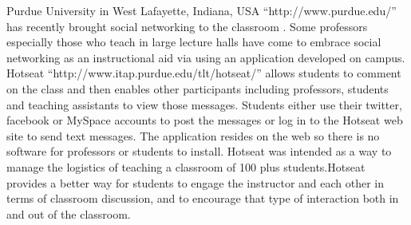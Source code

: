 \documentclass[12pt,a4paper,final,twoside,onecolumn,titlepage]{book}
\begin{document}
Purdue University in West Lafayette, Indiana, USA “http://www.purdue.edu/”  has recently brought social networking to the classroom \cite{W15}. Some professors especially those who teach in large lecture halls have come to embrace social networking as an instructional aid via using an application developed on campus. Hotseat “http://www.itap.purdue.edu/tlt/hotseat/” allows students to comment on the class and then enables other participants including professors, students and teaching assistants to view those messages. Students either use their twitter, facebook or MySpace accounts to post the messages or log in to the Hotseat web site to send text messages. The application resides on the web so there is no software for professors or students to install. Hotseat was intended as a way to manage the logistics of teaching a classroom of 100 plus students.Hotseat provides a better way for students to engage the instructor and each other in terms of classroom discussion, and to encourage that type of interaction both in and out of the classroom.
\end{document}
